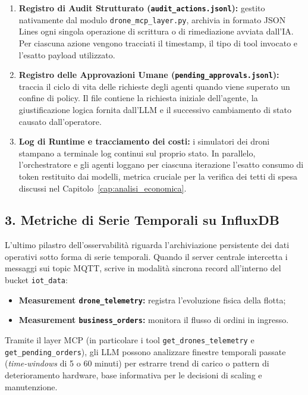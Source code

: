 \begin{enumerate}
    \item \textbf{Registro di Audit Strutturato (\texttt{audit\_actions.jsonl}):} gestito nativamente dal modulo \texttt{drone\_mcp\_layer.py}, archivia in formato JSON Lines ogni singola operazione di scrittura o di rimediazione avviata dall'IA. Per ciascuna azione vengono tracciati il timestamp, il tipo di tool invocato e l'esatto payload utilizzato.
    \item \textbf{Registro delle Approvazioni Umane (\texttt{pending\_approvals.jsonl}):} traccia il ciclo di vita delle richieste degli agenti quando viene superato un confine di policy. Il file contiene la richiesta iniziale dell'agente, la giustificazione logica fornita dall'LLM e il successivo cambiamento di stato causato dall'operatore.
    \item \textbf{Log di Runtime e tracciamento dei costi:} i simulatori dei droni stampano a terminale log continui sul proprio stato. In parallelo, l'orchestratore e gli agenti loggano per ciascuna iterazione l'esatto consumo di token restituito dai modelli, metrica cruciale per la verifica dei tetti di spesa discussi nel Capitolo~\ref{cap:analisi_economica}.
\end{enumerate}

\subsection*{3. Metriche di Serie Temporali su InfluxDB}
L'ultimo pilastro dell'osservabilità riguarda l'archiviazione persistente dei dati operativi sotto forma di serie temporali. Quando il server centrale intercetta i messaggi sui topic MQTT, scrive in modalità sincrona record all'interno del bucket \texttt{iot\_data}:

\begin{itemize}
    \item \textbf{Measurement \texttt{drone\_telemetry}:} registra l'evoluzione fisica della flotta;
    \item \textbf{Measurement \texttt{business\_orders}:} monitora il flusso di ordini in ingresso.
\end{itemize}

Tramite il layer MCP (in particolare i tool \texttt{get\_drones\_telemetry} e \texttt{get\_pending\_orders}), gli LLM possono analizzare finestre temporali passate (\textit{time-windows} di 5 o 60 minuti) per estrarre trend di carico o pattern di deterioramento hardware, base informativa per le decisioni di scaling e manutenzione.
